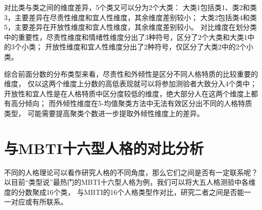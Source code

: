 \documentclass[UTF8]{ctexart}
\begin{document}
对比类与类之间的维度差异，5个类又可以分为2个大类：
大类1包括类1、类2和类3，主要差异在尽责性维度和宜人性维度，其余维度差别较小；
大类2包括类4和类5，主要差异在开放性维度和宜人性维度，其余维度差别较小。
对比维度在划分类中的重要性，尽责性维度和情绪性维度分出了3种符号，区分了2个大类和大类1中的3个小类；
开放性维度和宜人性维度分出了2种符号，仅区分了大类2中的2个小类。\par
综合前面分数的分布类型来看，尽责性和外倾性是区分不同人格特质的比较重要的维度，
仅以这两个维度上分数的高低表现就可以将参加测验者大致分入4个类中；
开放性和宜人性是在人格特质中区分度较低的维度，绝大部分人在这两个维度上都有高分倾向；
而外倾性维度在5-均值聚类方法中无法有效区分出不同的人格特质类型，
可能需要提高聚类个数进一步提取外倾性维度上的差异。
\section{与MBTI十六型人格的对比分析}
不同的人格理论可以看作研究人格的不同角度，那么它们之间是否有一定联系呢？
以目前“类型说”最热门的MBTI十六型人格为例，我们可以将大五人格测验中各维度的分数聚成16个类，
与MBTI的16个人格类型作对比，研究二者之间是否能一一对应或有所联系。
\end{document}

